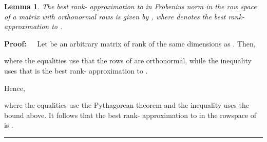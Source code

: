 \documentclass[11pt]{article}
\newtheorem{lemma}[theorem]{Lemma}
\newenvironment{proof}{\begin{trivlist} \item {\bf Proof:~~}}
  {\qed\end{trivlist}}
\def\qed{\hfill\rule{2mm}{2mm}}
\begin{document}
\begin{lemma}\label{lem:pythagorean}
The best rank- approximation to  in Frobenius norm in the row space
of a matrix  with orthonormal rows is given by , where 
 denotes the best rank- approximation to .
\end{lemma}
\begin{proof}
Let  be an arbitrary matrix of rank  of the same dimensions as . Then,

where the equalities use that the rows of  are orthonormal, while the 
inequality uses that  is the best rank- approximation to . 

Hence, 

where the equalities use the Pythagorean theorem and the inequality uses
the bound above. It follows that the best rank- approximation to  in the rowspace of 
is . 
\end{proof}
\end{document}
